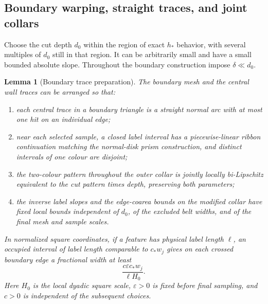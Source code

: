 \documentclass[11pt]{article}
\numberwithin{equation}{section}
\newtheorem{lemma}[theorem]{Lemma}
\theoremstyle{definition}
\theoremstyle{remark}
\begin{document}
\subsection{Boundary warping, straight traces, and joint collars}

Choose the cut depth $d_0$ within the region of exact $h_*$ behavior,
with several multiples of $d_0$ still in that region.  It can be
arbitrarily small and have a small bounded absolute slope.  Throughout
the boundary construction impose $\delta\ll d_0$.

\begin{lemma}[Boundary trace preparation]
\label{ms:boundary-collar}
The boundary mesh and the central wall traces can be arranged so that:
\begin{enumerate}
\item each central trace in a boundary triangle is a straight normal
arc with at most one hit on an individual edge;
\item near each selected sample, a closed label interval has a
piecewise-linear ribbon continuation matching the normal-disk prism
construction, and distinct intervals of one colour are disjoint;
\item the two-colour pattern throughout the outer collar is jointly
locally bi-Lipschitz equivalent to the cut pattern times depth,
preserving both parameters;
\item the inverse label slopes and the edge-coarea bounds on the
modified collar have fixed local bounds independent of $d_0$, of the
excluded belt widths, and of the final mesh and sample scales.
\end{enumerate}
In normalized square coordinates, if a feature has physical label
length $\ell$, an occupied interval of label length comparable to
$c_*w_j$ gives on each crossed boundary edge a fractional width at
least
\begin{equation}
 \frac{c\varepsilon c_*w_j}{\ell H_0}.
 \label{ms:boundary-width}
\end{equation}
Here $H_0$ is the local dyadic square scale, $\varepsilon>0$ is fixed
before final sampling, and $c>0$ is independent of the subsequent
choices.
\end{lemma}
\end{document}
